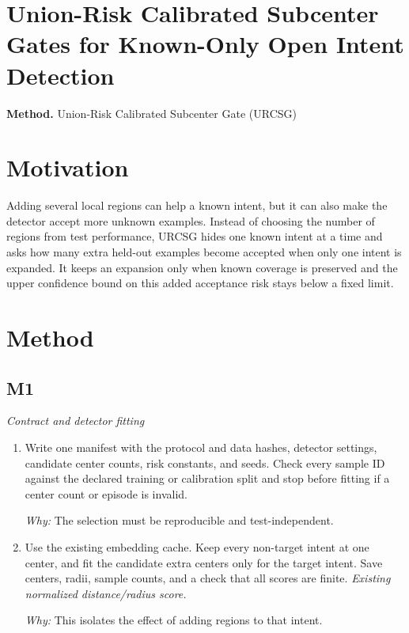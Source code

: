 \documentclass[10pt,a4paper]{article}
\begin{document}
\section*{Union-Risk Calibrated Subcenter Gates for Known-Only Open Intent Detection}
\textbf{Method.} Union-Risk Calibrated Subcenter Gate (URCSG)
\section*{Motivation}
Adding several local regions can help a known intent, but it can also make the detector accept more unknown examples. Instead of choosing the number of regions from test performance, URCSG hides one known intent at a time and asks how many extra held-out examples become accepted when only one intent is expanded. It keeps an expansion only when known coverage is preserved and the upper confidence bound on this added acceptance risk stays below a fixed limit.
\section*{Method}
\subsection*{M1}
\emph{Contract and detector fitting}
\begin{enumerate}[leftmargin=*,start=1]
  \item Write one manifest with the protocol and data hashes, detector settings, candidate center counts, risk constants, and seeds. Check every sample ID against the declared training or calibration split and stop before fitting if a center count or episode is invalid.
\par\emph{Why:} The selection must be reproducible and test-independent.
  \item Use the existing embedding cache. Keep every non-target intent at one center, and fit the candidate extra centers only for the target intent. Save centers, radii, sample counts, and a check that all scores are finite.
\noindent\emph{Existing normalized distance/radius score.}
\par{}
\par\emph{Why:} This isolates the effect of adding regions to that intent.
\end{enumerate}
\end{document}
